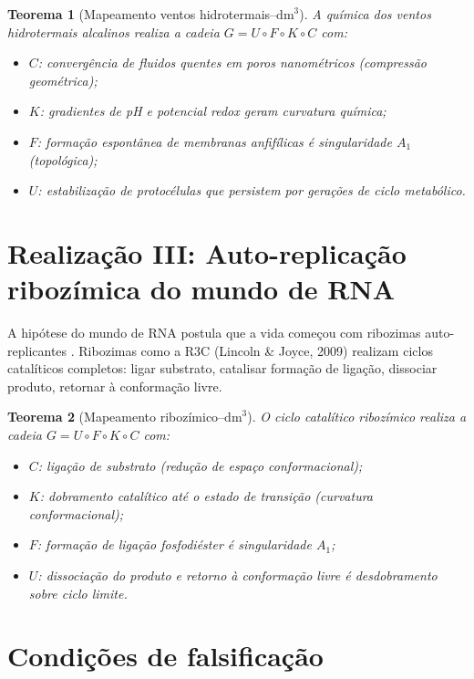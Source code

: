 \documentclass[12pt,a4paper,twoside]{book}
\theoremstyle{plain}
\newtheorem{teorema}{Teorema}[section]
\theoremstyle{definition}
\theoremstyle{definition}
\newcommand{\dm}{\mathrm{dm}^{3}}
\begin{document}
\begin{teorema}[Mapeamento ventos hidrotermais--$\dm$]
\label{thm:hidrotermais}
A química dos ventos hidrotermais alcalinos realiza a cadeia
$G = U \circ F \circ K \circ C$ com:
\begin{itemize}
  \item $C$: convergência de fluidos quentes em poros nanométricos
        (compressão geométrica);
  \item $K$: gradientes de pH e potencial redox geram curvatura química;
  \item $F$: formação espontânea de membranas anfifílicas é singularidade
        $A_{1}$ (topológica);
  \item $U$: estabilização de protocélulas que persistem por gerações de
        ciclo metabólico.
\end{itemize}
\end{teorema}

\section{Realização III: Auto-replicação ribozímica do mundo de RNA}

A hipótese do mundo de RNA postula que a vida começou com ribozimas
auto-replicantes \cite{Joyce}. Ribozimas como a R3C (Lincoln \& Joyce,
2009) realizam ciclos catalíticos completos: ligar substrato,
catalisar formação de ligação, dissociar produto, retornar à conformação
livre.

\begin{teorema}[Mapeamento ribozímico--$\dm$]\label{thm:ribozima}
O ciclo catalítico ribozímico realiza a cadeia
$G = U \circ F \circ K \circ C$ com:
\begin{itemize}
  \item $C$: ligação de substrato (redução de espaço conformacional);
  \item $K$: dobramento catalítico até o estado de transição
        (curvatura conformacional);
  \item $F$: formação de ligação fosfodiéster é singularidade $A_{1}$;
  \item $U$: dissociação do produto e retorno à conformação livre
        é desdobramento sobre ciclo limite.
\end{itemize}
\end{teorema}

\section{Condições de falsificação}
\end{document}
